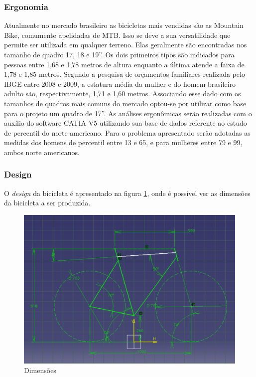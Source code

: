		\subsubsection{Ergonomia}
		Atualmente no mercado brasileiro as bicicletas mais vendidas são as Mountain Bike, comumente apelidadas de MTB. Isso se deve a sua versatilidade que permite ser utilizada em qualquer terreno. Elas geralmente são encontradas nos tamanho de quadro 17, 18 e 19”. Os dois primeiros tipos são indicados para pessoas entre 1,68 e 1,78 metros de altura enquanto a última atende a faixa de 1,78 e 1,85 metros. 
		Segundo a pesquisa de orçamentos familiares realizada pelo IBGE entre 2008 e 2009, a estatura média da mulher e do homem brasileiro adulto são, respectivamente, 1,71 e 1,60 metros. Associando esse dado com os tamanhos de quadros mais comuns do mercado optou-se por utilizar como base para o projeto um quadro de 17”.  
		As análises ergonômicas serão realizadas com o auxílio do software CATIA V5 utilizando sua base de dados referente ao estudo de percentil do norte americano. Para o problema apresentado serão adotadas as medidas dos homens de percentil entre 13 e 65, e para mulheres entre 79 e 99, ambos norte americanos.

		\subsubsection{Design}
	
		O \textit{design} da bicicleta é apresentado na figura \ref{img:dimensoes}, onde é possível ver as dimensões da bicicleta a ser produzida.	
		
			\graphicspath{{figuras/}}
			\begin{figure}[h!]
			\centering
			\includegraphics[scale=0.80]{dimensoes.png}
			\caption{Dimensões}
			\label{img:dimensoes}
			\end{figure}

